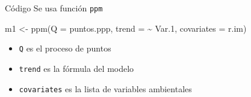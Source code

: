 \documentclass[
  11pt,
  ignorenonframetext,
]{beamer}
\newenvironment{Shaded}{}{}
\newcommand{\AttributeTok}[1]{\textcolor[rgb]{0.49,0.56,0.16}{#1}}
\newcommand{\FloatTok}[1]{\textcolor[rgb]{0.25,0.63,0.44}{#1}}
\newcommand{\FunctionTok}[1]{\textcolor[rgb]{0.02,0.16,0.49}{#1}}
\newcommand{\NormalTok}[1]{#1}
\newcommand{\OtherTok}[1]{\textcolor[rgb]{0.00,0.44,0.13}{#1}}
\newcommand{\SpecialCharTok}[1]{\textcolor[rgb]{0.25,0.44,0.63}{#1}}
\providecommand{\tightlist}{%
  \setlength{\itemsep}{0pt}\setlength{\parskip}{0pt}}
\begin{document}
\begin{frame}[fragile]{Código}
\protect\hypertarget{cuxf3digo}{}
Se usa función \texttt{ppm}

\begin{Shaded}
\begin{Highlighting}[]
\NormalTok{m1 }\OtherTok{\textless{}{-}} \FunctionTok{ppm}\NormalTok{(}\AttributeTok{Q =}\NormalTok{ puntos.ppp,}
          \AttributeTok{trend =} \SpecialCharTok{\textasciitilde{}}\NormalTok{ Var}\FloatTok{.1}\NormalTok{,}
          \AttributeTok{covariates =}\NormalTok{ r.im)}
\end{Highlighting}
\end{Shaded}

\begin{itemize}
\tightlist
\item
  \texttt{Q} es el proceso de puntos
\item
  \texttt{trend} es la fórmula del modelo
\item
  \texttt{covariates} es la lista de variables ambientales
\end{itemize}
\end{frame}
\end{document}
